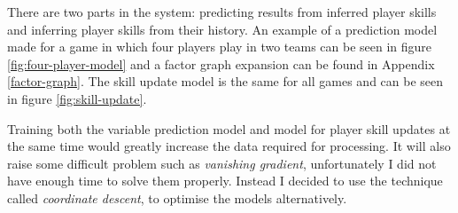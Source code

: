 \documentclass[12pt,a4paper]{book}
\begin{document}
There are two parts in the system: predicting results from inferred player skills and inferring player skills from their history.
An example of a prediction model made for a game in which four players play in two teams can be seen in figure \ref{fig:four-player-model} and a factor graph expansion can be found in Appendix \ref{factor-graph}.
The skill update model is the same for all games and can be seen in figure \ref{fig:skill-update}.

Training both the variable prediction model and model for player skill updates at the same time would greatly increase the data required for processing. %
It will also raise some difficult problem such as \emph{vanishing gradient}, unfortunately I did not have enough time to solve them properly.
Instead I decided to use the technique called \emph{coordinate descent}, to optimise the models alternatively.
\end{document}
